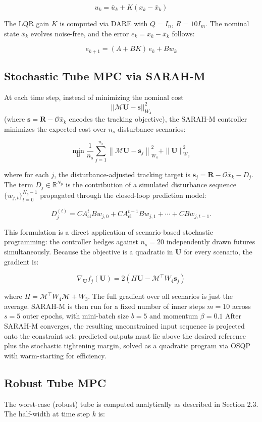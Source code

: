 \documentclass[11pt]{article}
\newcommand{\norm}[1]{\left|\left|#1\right|\right|}
\begin{document}
$$u_k = \bar{u}_k + K(x_k - \bar{x}_k)$$

The LQR gain $K$ is computed via DARE with $Q = I_n$, $R=10I_m$. The nominal state $\bar{x}_k$ evolves noise-free, and the error $e_k = x_k - \bar{x}_k$ follows:

$$e_{k+1} = (A + BK)\,e_k + Bw_k$$

\subsection{Stochastic Tube MPC via SARAH-M}
At each time step, instead of minimizing the nominal cost $$\norm{\mathcal{M}\mathbf{U} - \mathbf{s}}^2_{W_4}$$ (where $\mathbf{s} = \mathbf{R} - \mathcal{O}\bar{x}_k$ encodes the tracking objective), the SARAH-M controller minimizes the expected cost over $n_s$ disturbance scenarios:

$$\min_{\mathbf{U}} \frac{1}{n_s} \sum_{j=1}^{n_s} \left\| \mathcal{M}\mathbf{U} - \mathbf{s}_j \right\|^2_{W_4} + \|\mathbf{U}\|^2_{W_3}$$

where for each $j$, the disturbance-adjusted tracking target is $\mathbf{s}_j = \mathbf{R} - \mathcal{O}\bar{x}_k - D_j$. The term $D_j \in \mathbb{R}^{N_p}$ is the contribution of a simulated disturbance sequence $\{w_{j,t}\}_{t=0}^{N_p - 1}$ propagated through the closed-loop prediction model:

$$D_j^{(t)} = C A_{\text{cl}}^t B w_{j,0} + C A_{\text{cl}}^{t-1} B w_{j,1} + \cdots + C B w_{j,t-1}.$$

This formulation is a direct application of scenario-based stochastic programming: the controller hedges against $n_s=20$ independently drawn futures simultaneously. Because the objective is a quadratic in $\mathbf{U}$ for every scenario, the gradient is:

$$\nabla_\mathbf{U} f_j(\mathbf{U}) = 2\left(H\mathbf{U} - \mathcal{M}^\top W_4 \mathbf{s}_j\right)$$

where $H = \mathcal{M}^\top W_4 \mathcal{M} + W_3$. The full gradient over all scenarios is just the average. SARAH-M is then run for a fixed number of inner steps $m=10$ across $s=5$ outer epochs, with mini-batch size $b=5$ and momentum $\beta=0.1$ After SARAH-M converges, the resulting unconstrained input sequence is projected onto the constraint set: predicted outputs must lie above the desired reference plus the stochastic tightening margin, solved as a quadratic program via OSQP with warm-starting for efficiency.

\subsection{Robust Tube MPC}
The worst-case (robust) tube is computed analytically as described in Section 2.3. The half-width at time step $k$ is:
\end{document}
